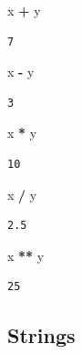 \documentclass[
  letterpaper,
]{scrbook}
\newenvironment{Shaded}{\begin{snugshade}}{\end{snugshade}}
\newcommand{\NormalTok}[1]{#1}
\newcommand{\OperatorTok}[1]{\textcolor[rgb]{0.81,0.36,0.00}{\textbf{#1}}}
\begin{document}
\begin{Shaded}
\begin{Highlighting}[]
\NormalTok{x }\OperatorTok{+}\NormalTok{ y}
\end{Highlighting}
\end{Shaded}

\begin{verbatim}
7
\end{verbatim}

\begin{Shaded}
\begin{Highlighting}[]
\NormalTok{x }\OperatorTok{-}\NormalTok{ y}
\end{Highlighting}
\end{Shaded}

\begin{verbatim}
3
\end{verbatim}

\begin{Shaded}
\begin{Highlighting}[]
\NormalTok{x }\OperatorTok{*}\NormalTok{ y}
\end{Highlighting}
\end{Shaded}

\begin{verbatim}
10
\end{verbatim}

\begin{Shaded}
\begin{Highlighting}[]
\NormalTok{x }\OperatorTok{/}\NormalTok{ y}
\end{Highlighting}
\end{Shaded}

\begin{verbatim}
2.5
\end{verbatim}

\begin{Shaded}
\begin{Highlighting}[]
\NormalTok{x }\OperatorTok{**}\NormalTok{ y}
\end{Highlighting}
\end{Shaded}

\begin{verbatim}
25
\end{verbatim}

\hypertarget{strings}{%
\subsection{Strings}\label{strings}}
\end{document}
